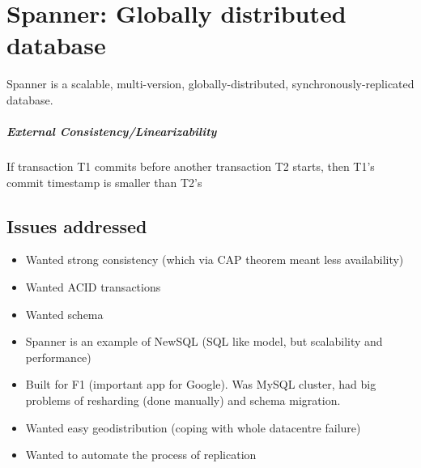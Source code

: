 \chapter{Spanner: Globally distributed database}

Spanner is a scalable, multi-version, globally-distributed, synchronously-replicated database.

\paragraph{External Consistency/Linearizability} If transaction T1 commits before another transaction T2 starts, then T1's commit timestamp is smaller than T2's


\section{Issues addressed} 
\begin{itemize}
    \item Wanted strong consistency (which via CAP theorem meant less availability)
    \item Wanted ACID transactions
    \item Wanted schema
    \item Spanner is an example of NewSQL (SQL like model, but scalability and performance)
    \item Built for F1 (important app for Google). Was MySQL cluster, had big problems of resharding (done manually) and schema migration.
    \item Wanted easy geodistribution (coping with whole datacentre failure)
    \item Wanted to automate the process of replication
\end{itemize}


